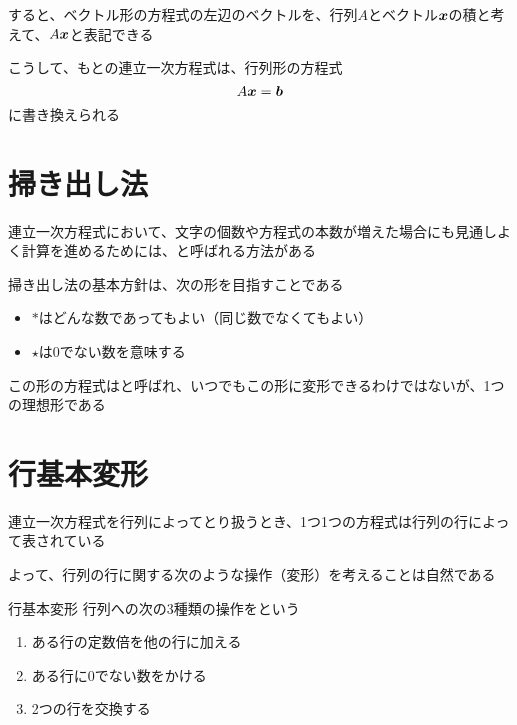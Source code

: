 \documentclass[../../../topic_linear-algebra]{subfiles}
\begin{document}
すると、ベクトル形の方程式の左辺のベクトルを、行列$A$とベクトル$\vb*{x}$の積と考えて、$A\vb*{x}$と表記できる

こうして、もとの連立一次方程式は、行列形の方程式
\begin{equation*}
  A\vb*{x} = \vb*{b}
\end{equation*}
に書き換えられる

\sectionline
\section{掃き出し法}

連立一次方程式において、文字の個数や方程式の本数が増えた場合にも見通しよく計算を進めるためには、と呼ばれる方法がある

\br

掃き出し法の基本方針は、次の形を目指すことである

\begin{center}
\end{center}

\begin{itemize}
  \item $*$はどんな数であってもよい（同じ数でなくてもよい）
  \item $\star$は0でない数を意味する
\end{itemize}

この形の方程式はと呼ばれ、いつでもこの形に変形できるわけではないが、1つの理想形である

\sectionline
\section{行基本変形}

連立一次方程式を行列によってとり扱うとき、1つ1つの方程式は行列の行によって表されている

よって、行列の行に関する次のような操作（変形）を考えることは自然である

\begin{definition}{行基本変形}
  行列への次の3種類の操作をという
  \begin{enumerate}[label=\romanlabel]
    \item ある行の定数倍を他の行に加える
    \item ある行に0でない数をかける
    \item 2つの行を交換する
  \end{enumerate}
\end{definition}
\end{document}
